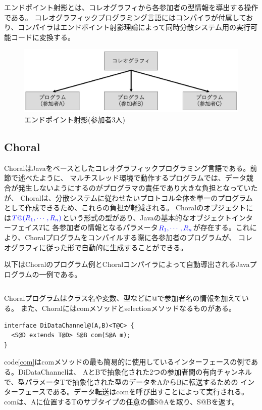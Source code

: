 \documentclass{thesis}
\begin{document}
エンドポイント射影とは、コレオグラフィから各参加者の型情報を導出する操作である。
コレオグラフィックプログラミング言語にはコンパイラが付属しており、コンパイラはエンドポイント射影理論によって同時分散システム用の実行可能コードに変換する。

\begin{figure}[H]
  \centering
  \includegraphics[scale=0.53]{image/epp.png}
  \caption{エンドポイント射影(参加者3人)}
\end{figure}
\subsection{Choral}
Choral\cite{choral}はJavaをベースとしたコレオグラフィックプログラミング言語である。前節で述べたように、
マルチスレッド環境で動作するプログラムでは、データ競合が発生しないようにするのがプログラマの責任であり大きな負担となっていたが、
Choralは、分散システムに従わせたいプロトコル全体を単一のプログラムとして作成できるため、これらの負担が軽減される。
Choralのオブジェクトには${\color{blue}{T@(R_1,\cdots,R_n)}}$という形式の型があり、Javaの基本的なオブジェクトインターフェイス$T$に
各参加者の情報となるパラメータ${\color{blue}{R_1,\cdots,R_n}}$が存在する。これにより、Choralプログラムをコンパイルする際に各参加者のプログラムが、
コレオグラフィに従った形で自動的に生成することができる。

以下はChoralのプログラム例とChoralコンパイラによって自動導出されるJavaプログラムの一例である\cite{ex_choral}。
\begin{lstlisting}[caption=Choralプログラムの例,label=choral]

\end{lstlisting}
Choralプログラムはクラス名や変数、型などに$@$で参加者名の情報を加えている。
また、Choralにはcomメソッドとselectionメソッドなるものがある\cite{objective_Choreographies}。

\begin{lstlisting}[caption=データ転送のための基本的な有向チャンネル,label=com]
interface DiDataChannel@(A,B)<T@C> {
  <S@D extends T@D> S@B com(S@A m);
} 
\end{lstlisting}
code\ref{com}はcomメソッドの最も簡易的に使用しているインターフェースの例である。DiDataChannelは、
AとBで抽象化された2つの参加者間の有向チャンネルで、型パラメータTで抽象化された型のデータをAからBに転送するための
インターフェースである。データ転送はcomを呼び出すことによって実行される。comは、Aに位置するTのサブタイプの任意の値S@Aを取り、S@Bを返す。
\end{document}
